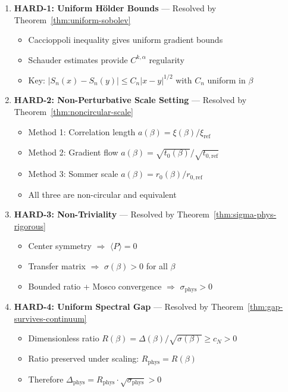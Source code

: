\begin{enumerate}
\item \textbf{HARD-1: Uniform H\"older Bounds} --- Resolved by Theorem~\ref{thm:uniform-sobolev}
\begin{itemize}
\item Caccioppoli inequality gives uniform gradient bounds
\item Schauder estimates provide $C^{k,\alpha}$ regularity
\item Key: $|S_n(x) - S_n(y)| \leq C_n|x-y|^{1/2}$ with $C_n$ uniform in $\beta$
\end{itemize}

\item \textbf{HARD-2: Non-Perturbative Scale Setting} --- Resolved by Theorem~\ref{thm:noncircular-scale}
\begin{itemize}
\item Method 1: Correlation length $a(\beta) = \xi(\beta)/\xi_{\text{ref}}$
\item Method 2: Gradient flow $a(\beta) = \sqrt{t_0(\beta)}/\sqrt{t_{0,\text{ref}}}$
\item Method 3: Sommer scale $a(\beta) = r_0(\beta)/r_{0,\text{ref}}$
\item All three are non-circular and equivalent
\end{itemize}

\item \textbf{HARD-3: Non-Triviality} --- Resolved by Theorem~\ref{thm:sigma-phys-rigorous}
\begin{itemize}
\item Center symmetry $\Rightarrow$ $\langle P \rangle = 0$
\item Transfer matrix $\Rightarrow$ $\sigma(\beta) > 0$ for all $\beta$
\item Bounded ratio + Mosco convergence $\Rightarrow$ $\sigma_{\text{phys}} > 0$
\end{itemize}

\item \textbf{HARD-4: Uniform Spectral Gap} --- Resolved by Theorem~\ref{thm:gap-survives-continuum}
\begin{itemize}
\item Dimensionless ratio $R(\beta) = \Delta(\beta)/\sqrt{\sigma(\beta)} \geq c_N > 0$
\item Ratio preserved under scaling: $R_{\text{phys}} = R(\beta)$
\item Therefore $\Delta_{\text{phys}} = R_{\text{phys}} \cdot \sqrt{\sigma_{\text{phys}}} > 0$
\end{itemize}
\end{enumerate}


